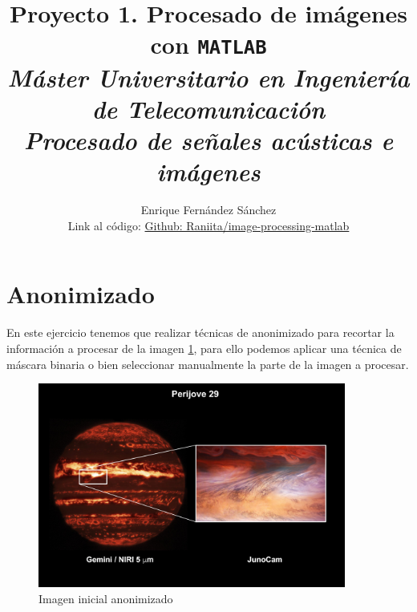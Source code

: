 \documentclass[12pt]{article}
\begin{document}
	
	\title{Proyecto 1. Procesado de imágenes con \texttt{MATLAB} \\ \textit{\textbf{\large Máster Universitario en Ingeniería de Telecomunicación}} \\ \textit{\large Procesado de señales acústicas e imágenes}}
	\author{Enrique Fernández Sánchez \\ Link al código: \href{https://github.com/Raniita/image-processing-matlab}{Github: Raniita/image-processing-matlab}}
	
	\maketitle
	
	\tableofcontents
	
	\lstlistoflistings
	
	\pagebreak
	
	\section{Anonimizado}
	
	\noindent En este ejercicio tenemos que realizar técnicas de anonimizado para recortar la información a procesar de la imagen \ref{img: anonimizado src}, para ello podemos aplicar una técnica de máscara binaria o bien seleccionar manualmente la parte de la imagen a procesar.
	
	\begin{figure}[h]
		\begin{center}
			\includegraphics[width=0.9\textwidth]{img/anonimizado.jpg}
			\caption{Imagen inicial anonimizado}
			\label{img: anonimizado src}
		\end{center}
	\end{figure}
\end{document}
